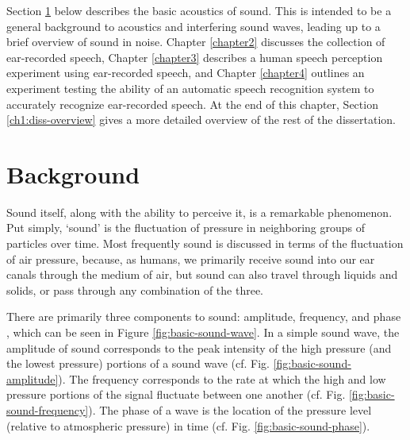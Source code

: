 Section \ref{ch1:background} below describes the basic acoustics of sound.  This is intended to be a general background to acoustics and interfering sound waves, leading up to a brief overview of sound in noise. Chapter \ref{chapter2} discusses the collection of ear-recorded speech, Chapter \ref{chapter3} describes a human speech perception experiment using ear-recorded speech, and Chapter \ref{chapter4} outlines an experiment testing the ability of an automatic speech recognition system to accurately recognize ear-recorded speech.  At the end of this chapter, Section \ref{ch1:diss-overview} gives a more detailed overview of the rest of the dissertation.

\section{Background}\label{ch1:background}

Sound itself, along with the ability to perceive it, is a remarkable phenomenon.  Put simply, `sound' is the fluctuation of pressure in neighboring groups of particles over time. Most frequently sound is discussed in terms of the fluctuation of air pressure, because, as humans, we primarily receive sound into our ear canals through the medium of air, but sound can also travel through \DIFdelbegin {}\DIFdelend liquids and solids, or pass through any combination of the three.

There are primarily three components to sound: amplitude, frequency, and phase \DIFaddbegin {}\DIFaddend , which can be seen in Figure \ref{fig:basic-sound-wave}.  In a simple sound wave, the amplitude of sound corresponds to the peak intensity of the high pressure (and the lowest pressure) portions of a sound wave (cf. Fig. \ref{fig:basic-sound-amplitude}).  The frequency corresponds to the rate at which the high and low pressure portions of the signal fluctuate between one another (cf. Fig. \ref{fig:basic-sound-frequency}).  The phase of a wave is the location of the pressure level (relative to atmospheric pressure) \DIFaddbegin {}\DIFaddend in time (cf. Fig. \ref{fig:basic-sound-phase}).

